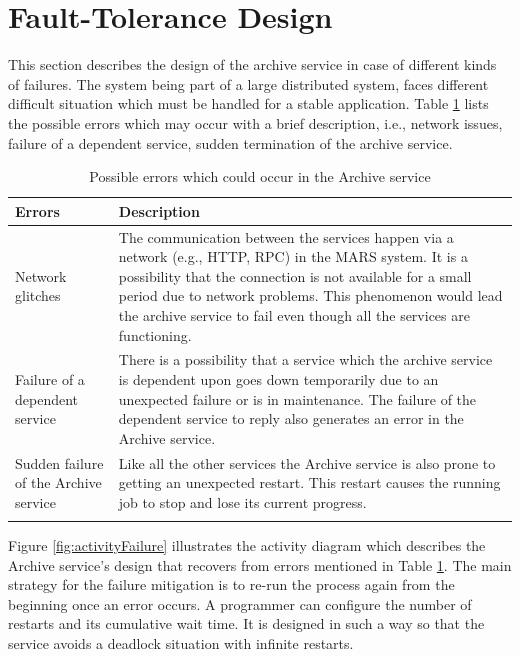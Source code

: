 \newpage
\section{Fault-Tolerance Design}
\label{sec:ftDesign}
This section describes the design of the archive service in case of different kinds of failures. The system being part of a large distributed system,
faces different difficult situation which must be handled for a stable application. Table \ref{table:probServices} lists the possible errors which 
may occur with a brief description, i.e., network issues, failure of a 
dependent service, sudden termination of the archive service. 
\begin{longtable}{|p{4cm}|p{10cm}|}
    \hline
        \textbf{Errors}  & \textbf{Description}\\
    \hline
        Network glitches & The communication between the services
        happen via a network (e.g., HTTP, RPC) in the MARS system. It is a possibility that the connection is not available for a small period due to network problems.
        This phenomenon would lead the archive service to fail even though all the services are functioning.\\
    \hline
        Failure of a dependent service & There is a possibility that a service which the archive service is dependent upon goes down temporarily due to an unexpected
        failure or is in maintenance. The failure of the dependent service to reply also generates an error in the Archive service.\\
    \hline
        Sudden failure of the Archive service & Like all the other services the Archive service is also prone to getting an unexpected restart. 
        This restart causes the running job to stop and lose its current progress.\\    
    \hline
    \caption{Possible errors which could occur in the Archive service}
    \label{table:probServices} 
\end{longtable}

Figure \ref{fig:activityFailure} illustrates the activity diagram which describes the Archive service's design that recovers from errors mentioned in
Table \ref{table:probServices}. The main strategy for the failure mitigation is to re-run the process again from the beginning once an error occurs. 
A programmer can configure the number of restarts and its cumulative wait time. It is designed in such a way so that the service avoids a deadlock situation with infinite restarts.


